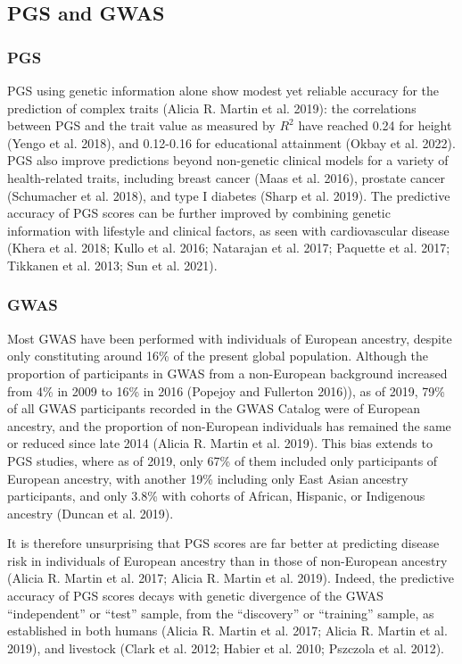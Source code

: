 \documentclass[
]{book}
\begin{document}
\hypertarget{pgs-and-gwas}{%
\subsection{PGS and GWAS}\label{pgs-and-gwas}}

\hypertarget{pgs}{%
\subsubsection{PGS}\label{pgs}}

PGS using genetic information alone show modest yet reliable accuracy for the prediction of complex traits (Alicia R. Martin et al. 2019): the correlations between PGS and the trait value as measured by \(R^2\) have reached 0.24 for height (Yengo et al. 2018), and 0.12-0.16 for educational attainment (Okbay et al. 2022). PGS also improve predictions beyond non-genetic clinical models for a variety of health-related traits, including breast cancer (Maas et al. 2016), prostate cancer (Schumacher et al. 2018), and type I diabetes (Sharp et al. 2019). The predictive accuracy of PGS scores can be further improved by combining genetic information with lifestyle and clinical factors, as seen with cardiovascular disease (Khera et al. 2018; Kullo et al. 2016; Natarajan et al. 2017; Paquette et al. 2017; Tikkanen et al. 2013; Sun et al. 2021).

\hypertarget{gwas}{%
\subsubsection{GWAS}\label{gwas}}

Most GWAS have been performed with individuals of European ancestry, despite only constituting around 16\% of the present global population. Although the proportion of participants in GWAS from a non-European background increased from 4\% in 2009 to 16\% in 2016 (Popejoy and Fullerton 2016)), as of 2019, 79\% of all GWAS participants recorded in the GWAS Catalog were of European ancestry, and the proportion of non-European individuals has remained the same or reduced since late 2014 (Alicia R. Martin et al. 2019). This bias extends to PGS studies, where as of 2019, only 67\% of them included only participants of European ancestry, with another 19\% including only East Asian ancestry participants, and only 3.8\% with cohorts of African, Hispanic, or Indigenous ancestry (Duncan et al. 2019).

It is therefore unsurprising that PGS scores are far better at predicting disease risk in individuals of European ancestry than in those of non-European ancestry (Alicia R. Martin et al. 2017; Alicia R. Martin et al. 2019). Indeed, the predictive accuracy of PGS scores decays with genetic divergence of the GWAS ``independent'' or ``test'' sample, from the ``discovery'' or ``training'' sample, as established in both humans (Alicia R. Martin et al. 2017; Alicia R. Martin et al. 2019), and livestock (Clark et al. 2012; Habier et al. 2010; Pszczola et al. 2012).
\end{document}
